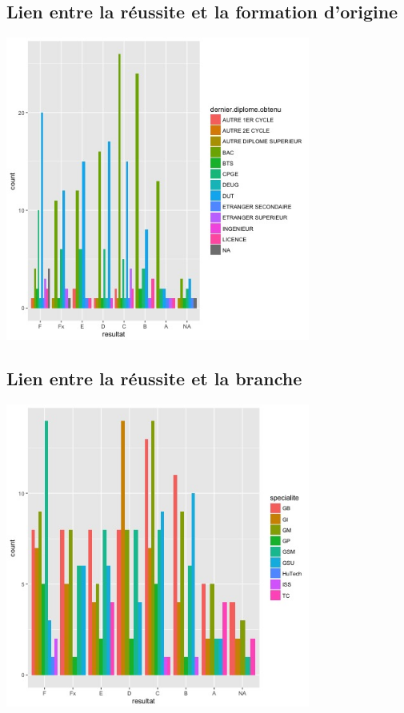 \documentclass[]{report}
\begin{document}
	
\subsection{Lien entre la réussite et la formation d'origine}

	\begin{center}
	\includegraphics[width=100mm]{Figures/Notes/diplome_resultat.jpg}
	\label{fig:formation_resultat}
	\end{center}

\subsection{Lien entre la réussite et la branche}

	\begin{center}
	\includegraphics[width=100mm]{Figures/Notes/specialite_resultat.jpg}
	\label{fig:specialite_resultat}
	\end{center}
\end{document}
